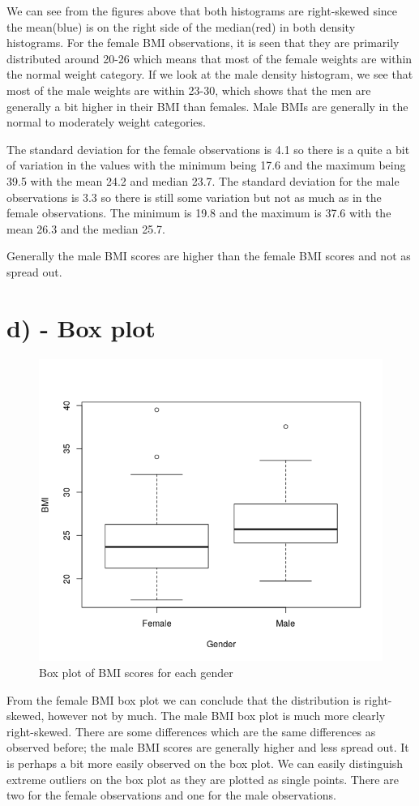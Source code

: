 \documentclass{memoir}
\begin{document}
We can see from the figures above that both histograms are right-skewed since the mean(blue) is on the right side of the median(red) in both density histograms.
For the female BMI observations, it is seen that they are primarily distributed around 20-26 which means that most of the female weights are within the normal weight category.
If we look at the male density histogram, we see that most of the male weights are within 23-30, which shows that the men are generally a bit higher in their BMI than females. Male BMIs are generally in the normal to moderately weight categories. 

The standard deviation for the female observations is 4.1 so there is a quite a bit of variation in the values with the minimum being 17.6 and the maximum being 39.5 with the mean 24.2 and median 23.7. 
The standard deviation for the male observations is 3.3 so there is still some variation but not as much as in the female observations. The minimum is 19.8 and the maximum is 37.6 with the mean 26.3 and the median 25.7. 

Generally the male BMI scores are higher than the female BMI scores and not as spread out. 

\section{d) - Box plot}
\begin{figure}[H]
	\centering
	\includegraphics[scale=0.7]{boxplot.png}
	\caption{Box plot of BMI scores for each gender}
\end{figure}
From the female BMI box plot we can conclude that the distribution is right-skewed, however not by much. The male BMI box plot is much more clearly right-skewed. 
There are some differences which are the same differences as observed before; the male BMI scores are generally higher and less spread out. It is perhaps a bit more easily observed on the box plot. 
We can easily distinguish extreme outliers on the box plot as they are plotted as single points. There are two for the female observations and one for the male observations. 
\end{document}
